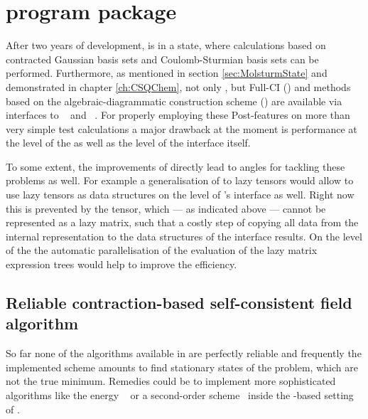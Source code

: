 \section{\molsturm program package}
After two years of development,
\molsturm is in a state,
where calculations based on contracted Gaussian basis sets
and Coulomb-Sturmian basis sets can be performed.
Furthermore, as mentioned in section \vref{sec:MolsturmState}
and demonstrated in chapter \vref{ch:CSQChem},
not only \HF, but Full-CI (\FCI) and
methods based on the algebraic-diagrammatic construction scheme (\ADC)
are available
via interfaces to \pyscf~\cite{Sun2017} and \adcman~\cite{Wormit2014}.
For properly employing these Post-\HF features on more than
very simple test calculations
a major drawback at the moment is performance
at the level of the \SCF as well as the level of the interface itself.

To some extent, the improvements
of \lazyten directly lead to angles for tackling these problems as well.
For example a generalisation of \lazyten to lazy tensors
would allow to use lazy tensors as data structures on the level of \molsturm's
interface as well.
Right now this is prevented by the \ERI tensor,
which --- as indicated above --- cannot be represented as a lazy matrix,
such that a costly step of copying all data from the internal
representation to the data structures of the interface results.
On the level of the \SCF the automatic parallelisation
of the evaluation of the lazy matrix expression trees
would help to improve the efficiency.

\subsection{Reliable contraction-based self-consistent field algorithm}
So far none of the \SCF algorithms available in \molsturm
are perfectly reliable and frequently the implemented \SCF scheme
amounts to find stationary states of the \HF problem,
which are not the true \SCF minimum.
Remedies could be to implement more sophisticated algorithms like
the energy \DIIS~\cite{Kudin2002}
or a second-order \SCF scheme~\cite{Salek2007,Hoest2008}
inside the \contraction-based setting of \molsturm.

